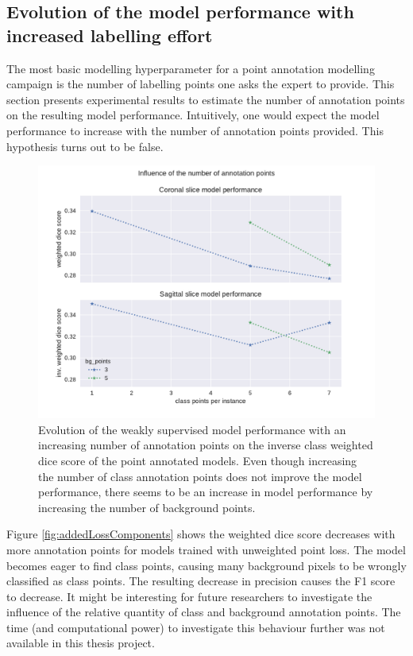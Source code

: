 \subsection{Evolution of the model performance with increased labelling effort\label{sec:numberofpoints}}
\par{
    The most basic modelling hyperparameter for a point annotation modelling campaign is the number of labelling points one asks the expert to provide.
    This section presents experimental results to estimate the number of annotation points on the resulting model performance.
    Intuitively, one would expect the model performance to increase with the number of annotation points provided.
    This hypothesis turns out to be false.
}
\begin{figure}
    \centering
    \includegraphics[width=.95\textwidth]{images/BlobPoints_influence.pdf}
    \caption{Evolution of the weakly supervised model performance with an increasing number of annotation points on the inverse class weighted dice score of the point annotated models.
    Even though increasing the number of class annotation points does not improve the model performance, there seems to be an increase in model performance by increasing the number of background points.
    \label{fig:points_influence}}
\end{figure}

\par{
    Figure \ref{fig:addedLossComponents} shows the weighted dice score decreases with more annotation points for models trained with unweighted point loss.
    The model becomes eager to find class points, causing many background pixels to be wrongly classified as class points.
    The resulting decrease in precision causes the F1 score to decrease.
    It might be interesting for future researchers to investigate the influence of the relative quantity of class and background annotation points.
    The time (and computational power) to investigate this behaviour further was not available in this thesis project.
}